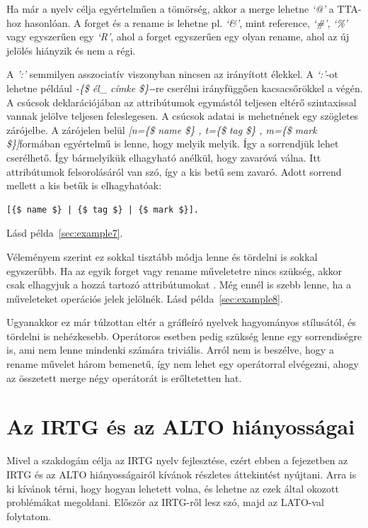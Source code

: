 Ha már a nyelv célja egyértelműen a tömörség, akkor a merge lehetne \textit{‘@’} a TTA-hoz hasonlóan. A forget és a rename is lehetne pl. \textit{‘\&’}, mint reference, \textit{‘\#’}, \textit{‘\%’} vagy egyszerűen egy \textit{‘R’}, ahol a forget egyszerűen egy olyan rename, ahol az új jelölés hiányzik és nem a régi.

A \textit{':'} semmilyen asszociatív viszonyban nincsen az irányított élekkel. A \textit{‘:’}-ot lehetne például \textit{-\{\$ él\_ címke \$\}-}-re cserélni irányfüggően kacsacsőrökkel a végén.
A csúcsok deklarációjában az attribútumok egymástól teljesen eltérő szintaxissal vannak jelölve teljesen feleslegesen. A csúcsok adatai is mehetnének egy szögletes zárójelbe. A zárójelen belül \textit{[n=\{\$ name \$\} , t=\{\$ tag \$\} , m=\{\$ mark \$\}]}formában egyértelmű is lenne, hogy melyik melyik. Így a sorrendjük lehet cserélhető. Így bármelyikük elhagyható anélkül, hogy zavaróvá válna. Itt attribútumok felsorolásáról van szó, így a kis betű sem zavaró. Adott sorrend mellett a kis betűk is elhagyhatóak:
\begin{verbatim}
[{$ name $} | {$ tag $} | {$ mark $}].
\end{verbatim}
 Lásd példa~\ref{sec:example7}.

Véleményem szerint ez sokkal tisztább módja lenne és tördelni is sokkal egyszerűbb. Ha az egyik forget vagy rename műveletetre nincs szükség, akkor csak elhagyjuk a hozzá tartozó attribútumokat . Még ennél is szebb lenne, ha a műveleteket operációs jelek jelölnék. Lásd példa~\ref{sec:example8}.

Ugyanakkor ez már túlzottan eltér a gráfleíró nyelvek hagyományos stílusától, és tördelni is nehézkesebb. Operátoros esetben pedig szükség lenne egy sorrendiségre is, ami nem lenne mindenki számára triviális. Arról nem is beszélve, hogy a rename művelet három bemenetű, így nem lehet egy operátorral elvégezni, ahogy az összetett merge négy operátorát is erőltetetten hat.


\section{Az IRTG és az ALTO hiányosságai}
\label{sec:shortcomming}
Mivel a szakdogám célja az IRTG nyelv fejlesztése, ezért ebben a fejezetben az IRTG és az ALTO hiányosságairól kívánok részletes áttekintést nyújtani.
Arra is ki kívánok térni, hogy hogyan lehetett volna, és lehetne az ezek által okozott problémákat megoldani.
Először az IRTG-ről lesz szó, majd az LATO-val folytatom.

